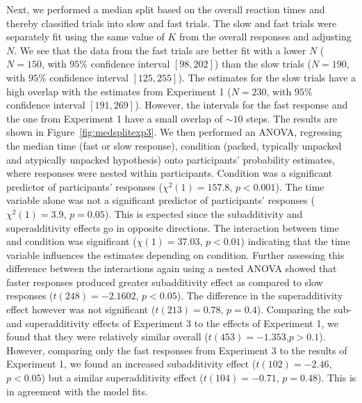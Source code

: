 Next, we performed a median split based on the overall reaction times and thereby classified trials into slow and fast trials. The slow and fast trials were separately fit using the same value of $K$ from the overall responses and adjusting $N$.
We see that the data from the fast trials are better fit with a lower $N$ ($N = 150$, with $95\%$ confidence interval $[98, 202]$) than the slow trials ($N = 190$, with $95\%$ confidence interval $[125, 255]$). The estimates for the slow trials have a high overlap with the estimates from Experiment 1 ($N = 230$, with $95\%$ confidence interval $[191, 269]$). However, the intervals for the fast response and the one from Experiment 1 have a small overlap of $\sim 10$ steps. 
The results are shown in Figure~\ref{fig:medsplitexp3}. We then performed an ANOVA, regressing the median time (fast or slow response), condition (packed, typically unpacked and atypically unpacked hypothesis) onto participants' probability estimates, where responses were nested within participants. Condition was a significant predictor of participants' responses ($\chi^2(1)=157.8$, $p<0.001$). The time variable alone was not a significant predictor of participants' responses ($\chi^2(1)=3.9$, $p=0.05$). This is expected since the subadditivity and superadditivity effects go in opposite directions. The interaction between time and condition was significant ($\chi(1)=37.03$, $p<0.01$) indicating that the time variable influences the estimates depending on condition. Further assessing this difference between the interactions again using a nested ANOVA showed that faster responses produced greater subadditivity effect as compared to slow responses ($t(248)=-2.1602$, $p<0.05$). The difference in the superadditivity effect however was not significant ($t(213)= 0.78$, $p=0.4$).
Comparing the sub- and superadditivity effects of Experiment 3 to the effects of Experiment 1, we found that they were relatively similar overall ($t(453)=-1.353$,$p>0.1$). However, comparing only the fast responses from Experiment 3 to the results of Experiment 1, we found an increased subadditivity effect ($t(102)=-2.46$, $p<0.05$) but a similar superadditivity effect ($t(104)=-0.71$, $p=0.48$).
This is in agreement with the model fits.


